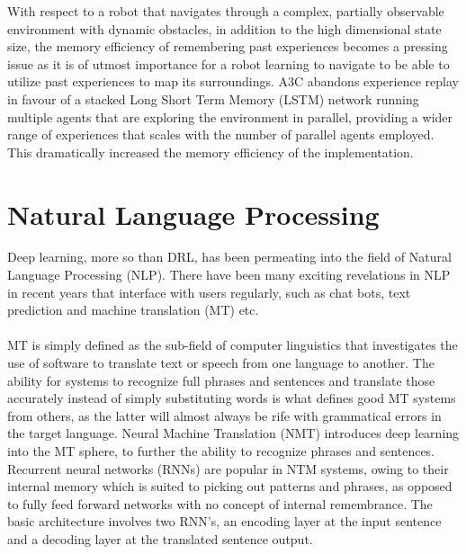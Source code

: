 With respect to a robot that navigates through a complex, partially observable environment with dynamic obstacles, in addition to the high dimensional state size, the memory efficiency of remembering past experiences becomes a pressing issue as it is of utmost importance for a robot learning to navigate to be able to utilize past experiences to map its surroundings. A3C abandons experience replay in favour of a stacked Long Short Term Memory (LSTM) network running multiple agents that are exploring the environment in parallel, providing a wider range of experiences that scales with the number of parallel agents employed. This dramatically increased the memory efficiency of the implementation.

\section{Natural Language Processing}
Deep learning, more so than DRL, has been permeating into the field of Natural Language Processing (NLP). There have been many exciting revelations in NLP in recent years that interface with users regularly, such as chat bots, text prediction and machine translation (MT) etc. \paragraph{}

MT is simply defined as the sub-field of computer linguistics that investigates the use of software to translate text or speech from one language to another. The ability for systems to recognize full phrases and sentences and translate those accurately instead of simply substituting words is what defines good MT systems from others, as the latter will almost always be rife with grammatical errors in the target language. Neural Machine Translation (NMT) introduces deep learning into the MT sphere, to further the ability to recognize phrases and sentences. Recurrent neural networks (RNNs) are popular in NTM systems, owing to their internal memory which is suited to picking out patterns and phrases, as opposed to fully feed forward networks with no concept of internal remembrance. The basic architecture involves two RNN's, an encoding layer at the input sentence and a decoding layer at the translated sentence output. \paragraph{}

